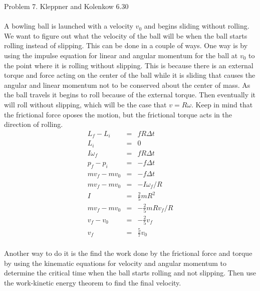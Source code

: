 \documentclass[11pt]{amsart}
\begin{document}
Problem 7. Kleppner and Kolenkow 6.30 \\ \\
A bowling ball is launched with a velocity $v_{0}$ and begins sliding without rolling. We want to figure out what the velocity of the ball will be when the ball starts rolling instead of slipping. This can be done in a couple of ways. One way is by using the impulse equation for linear and angular momentum for the ball at $v_{0}$ to the point where it is rolling without slipping. This is because there is an external torque and force acting on the center of the ball while it is sliding that causes the angular and linear momentum not to be conserved about the center of mass. As the ball travels it begins to roll because of the external torque. Then eventually it will roll without slipping, which will be the case that $v=R\omega$. Keep in mind that the frictional force oposes the motion, but the frictional torque acts in the direction of rolling. \\
\begin{eqnarray*}
L_{f}-L_{i} &=& fR\Delta{t} \\
L_{i} &=& 0 \\
I\omega_{f} &=& fR\Delta{t} \\
p_{f}-p_{i} &=& -f\Delta{t} \\
 mv_{f}-mv_{0} &=& -f\Delta{t} \\
mv_{f}-mv_{0} &=& -I\omega_{f}/R \\
I &=& \frac{2}{5}mR^{2} \\
mv_{f}-mv_{0} &=& -\frac{2}{5}mRv_{f}/R \\
v_{f}-v_{0} &=& -\frac{2}{5}v_{f} \\
v_{f} &=& \frac{5}{7}v_{0} 
\end{eqnarray*} \\
Another way to do it is the find the work done by the frictional force and torque by using the kinematic equations for velocity and angular momentum to determine the critical time when the ball starts rolling and not slipping. Then use the work-kinetic energy theorem to find the final velocity.  \\
\end{document}
